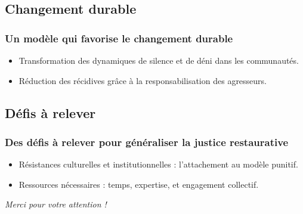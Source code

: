 \documentclass[french]{beamer}
\begin{document}
\subsection{Changement durable}
\begin{frame}
	\frametitle{Un modèle qui favorise le changement durable}
	\begin{itemize}
		\item Transformation des dynamiques de silence et de déni dans les communautés.
		\item Réduction des récidives grâce à la responsabilisation des agresseurs.
	\end{itemize}
\end{frame}

\subsection{Défis à relever}
\begin{frame}
	\frametitle{Des défis à relever pour généraliser la justice restaurative}
	\begin{itemize}
		\item Résistances culturelles et institutionnelles : l’attachement au modèle punitif.
		\item Ressources nécessaires : temps, expertise, et engagement collectif.
	\end{itemize}
\end{frame}

\begin{frame}[plain]
	\addtocounter{framenumber}{-1}
	\begin{center}
		\huge
		\textit{Merci pour votre attention !}
	\end{center}
\end{frame}
\end{document}
